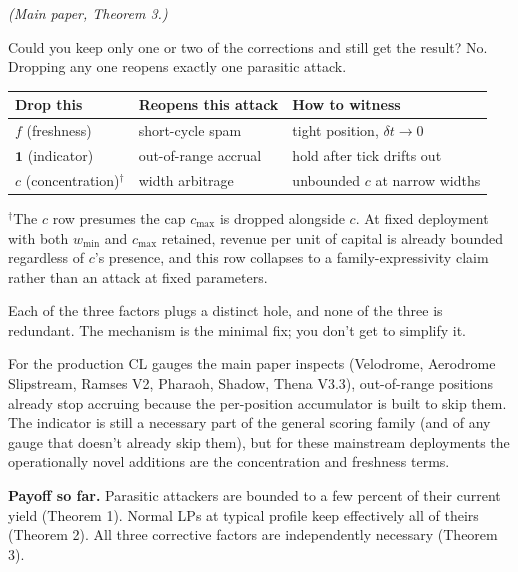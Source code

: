 \documentclass[11pt,a4paper]{article}
\begin{document}
\emph{(Main paper, Theorem 3.)}

Could you keep only one or two of the corrections and still get the result? No. Dropping any one reopens exactly one parasitic attack.

\begin{result}
\begin{center}
\begin{tabular}{@{}lll@{}}
\toprule
Drop this & Reopens this attack & How to witness \\
\midrule
$f$ (freshness) & short-cycle spam & tight position, $\delta t \to 0$ \\
$\mathbf{1}$ (indicator) & out-of-range accrual & hold after tick drifts out \\
$c$ (concentration)$^\dagger$ & width arbitrage & unbounded $c$ at narrow widths \\
\bottomrule
\end{tabular}
\end{center}
\end{result}

\footnotesize $^\dagger$The $c$ row presumes the cap $c_{\max}$ is dropped alongside $c$. At fixed deployment with both $w_{\min}$ and $c_{\max}$ retained, revenue per unit of capital is already bounded regardless of $c$'s presence, and this row collapses to a family-expressivity claim rather than an attack at fixed parameters.\normalsize

\begin{intuition}
Each of the three factors plugs a distinct hole, and none of the three is redundant. The mechanism is the minimal fix; you don't get to simplify it.

For the production CL gauges the main paper inspects (Velodrome, Aerodrome Slipstream, Ramses V2, Pharaoh, Shadow, Thena V3.3), out-of-range positions already stop accruing because the per-position accumulator is built to skip them. The indicator is still a necessary part of the general scoring family (and of any gauge that doesn't already skip them), but for these mainstream deployments the operationally novel additions are the concentration and freshness terms.
\end{intuition}

\begin{result}
\textbf{Payoff so far.} Parasitic attackers are bounded to a few percent of their current yield (Theorem 1). Normal LPs at typical profile keep effectively all of theirs (Theorem 2). All three corrective factors are independently necessary (Theorem 3).
\end{result}
\end{document}
